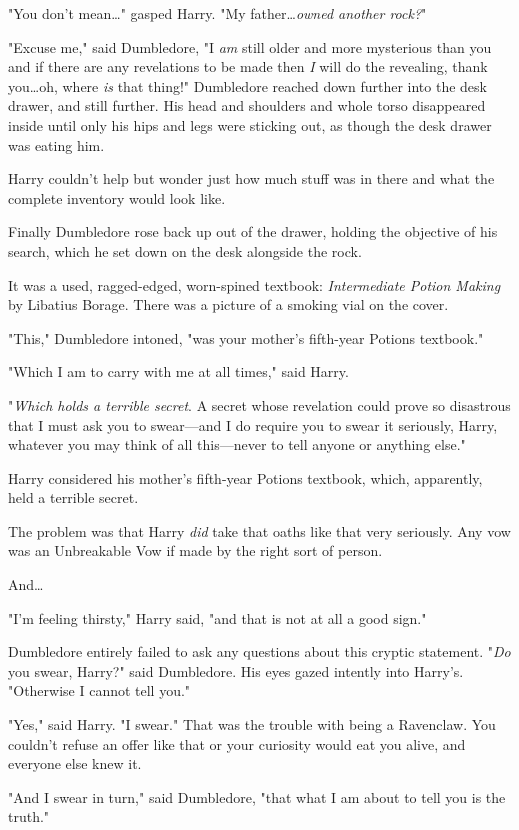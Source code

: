 "You don’t mean…" gasped Harry. "My father…\emph{owned another
rock?}"

"Excuse me," said Dumbledore, "I \emph{am} still older and more mysterious than
you and if there are any revelations to be made then \emph{I} will do the
revealing, thank you…oh, where \emph{is} that thing!" Dumbledore
reached down further into the desk drawer, and still further. His head and
shoulders and whole torso disappeared inside until only his hips and legs were
sticking out, as though the desk drawer was eating him.

Harry couldn’t help but wonder just how much stuff was in there and what the
complete inventory would look like.

Finally Dumbledore rose back up out of the drawer, holding the objective of his
search, which he set down on the desk alongside the rock.

It was a used, ragged-edged, worn-spined textbook: \emph{Intermediate Potion
Making} by Libatius Borage. There was a picture of a smoking vial on the cover.

"This," Dumbledore intoned, "was your mother’s fifth-year Potions textbook."

"Which I am to carry with me at all times," said Harry.

"\emph{Which holds a terrible secret}. A secret whose revelation could prove so
disastrous that I must ask you to swear—and I do require you to swear it
seriously, Harry, whatever you may think of all this—never to tell anyone or
anything else."

Harry considered his mother’s fifth-year Potions textbook, which, apparently,
held a terrible secret.

The problem was that Harry \emph{did} take that oaths like that very seriously.
Any vow was an Unbreakable Vow if made by the right sort of person.

And…

"I’m feeling thirsty," Harry said, "and that is not at all a good sign."

Dumbledore entirely failed to ask any questions about this cryptic statement.
"\emph{Do} you swear, Harry?" said Dumbledore. His eyes gazed intently into
Harry’s. "Otherwise I cannot tell you."

"Yes," said Harry. "I swear." That was the trouble with being a Ravenclaw. You
couldn’t refuse an offer like that or your curiosity would eat you alive, and
everyone else knew it.

"And I swear in turn," said Dumbledore, "that what I am about to tell you is
the truth."

